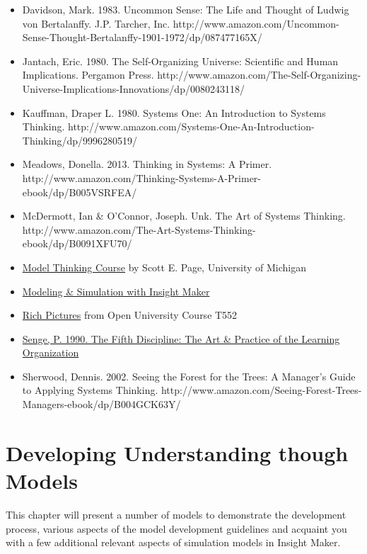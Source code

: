 \documentclass[]{memoir}
\begin{document}
\begin{itemize}
\itemsep1pt\parskip0pt
\item
  Davidson, Mark. 1983. Uncommon Sense: The Life and Thought of Ludwig
  von Bertalanffy. J.P. Tarcher, Inc.
  http://www.amazon.com/Uncommon-Sense-Thought-Bertalanffy-1901-1972/dp/087477165X/
\item
  Jantach, Eric. 1980. The Self-Organizing Universe: Scientific and
  Human Implications. Pergamon Press.
  http://www.amazon.com/The-Self-Organizing-Universe-Implications-Innovations/dp/0080243118/
\item
  Kauffman, Draper L. 1980. Systems One: An Introduction to Systems
  Thinking.
  http://www.amazon.com/Systems-One-An-Introduction-Thinking/dp/9996280519/
\item
  Meadows, Donella. 2013. Thinking in Systems: A Primer.
  http://www.amazon.com/Thinking-Systems-A-Primer-ebook/dp/B005VSRFEA/
\item
  McDermott, Ian \& O'Connor, Joseph. Unk. The Art of Systems Thinking.
  http://www.amazon.com/The-Art-Systems-Thinking-ebook/dp/B0091XFU70/
\item
  \href{https://www.coursera.org/course/modelthinking}{Model Thinking
  Course} by Scott E. Page, University of Michigan
\item
  \href{http://www.systemswiki.org/index.php?title=Modeling_\%26_Simulation_with_Insight_Maker}{Modeling
  \& Simulation with Insight Maker}
\item
  \href{http://systems.open.ac.uk/materials/T552/pages/rich/richAppendix.html}{Rich
  Pictures} from Open University Course T552
\item
  \href{http://www.amazon.com/Fifth-Discipline-Practice-Organization-ebook/dp/B000SEIFKK/}{Senge,
  P. 1990. The Fifth Discipline: The Art \& Practice of the Learning
  Organization}
\item
  Sherwood, Dennis. 2002. Seeing the Forest for the Trees: A Manager's
  Guide to Applying Systems Thinking.
  http://www.amazon.com/Seeing-Forest-Trees-Managers-ebook/dp/B004GCK63Y/
\end{itemize}

\chapter{Developing Understanding though Models}

This chapter will present a number of models to demonstrate the
development process, various aspects of the model development guidelines
and acquaint you with a few additional relevant aspects of simulation
models in Insight Maker.
\end{document}
